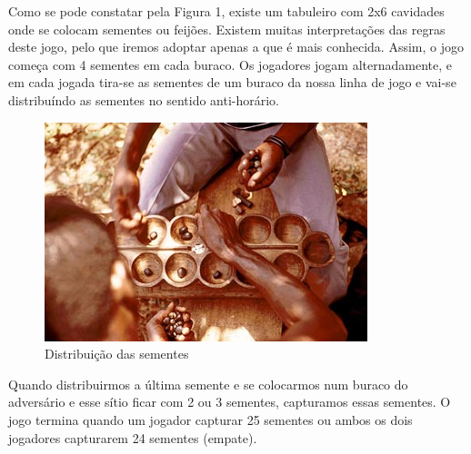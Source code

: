 \documentclass[15pt,a4paper]{article}
\begin{document}
Como se pode constatar pela Figura 1, existe um tabuleiro com 2x6 cavidades onde se colocam sementes ou feijões. Existem muitas interpretações das regras deste jogo, pelo que iremos adoptar apenas a que é mais conhecida. Assim, o jogo começa com 4 sementes em cada buraco. Os jogadores jogam alternadamente, e em cada jogada tira-se as sementes de um buraco da nossa linha de jogo e vai-se distribuíndo as sementes no sentido anti-horário.
\begin{figure}[H]
\begin{center}
\includegraphics[scale=0.5]{oware.jpg}
\caption{Distribuição das sementes}
\label{fig:peoplePlaying}
\end{center}
\end{figure}
 \indent Quando distribuirmos a última semente e se colocarmos num buraco do adversário e esse sítio ficar com 2 ou 3 sementes, capturamos essas sementes. O jogo termina quando um jogador capturar 25 sementes ou ambos os dois jogadores capturarem 24 sementes (empate).
\end{document}
